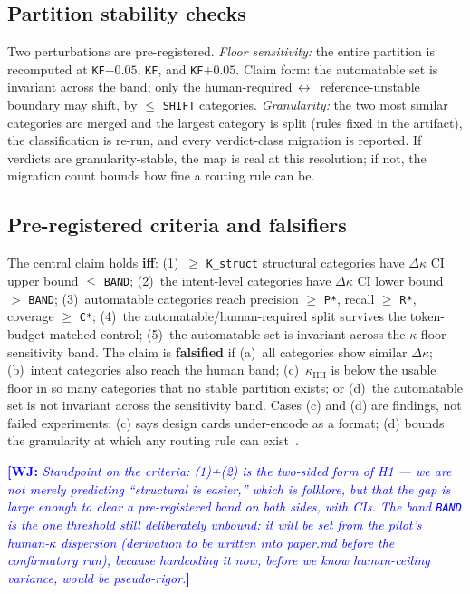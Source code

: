 \documentclass[conference]{IEEEtran}
\newcommand{\wj}[1]{\textcolor{blue}{\textbf{[WJ:} \textit{#1}\textbf{]}}}
\newcommand{\ph}[1]{\colorbox{yellow!35}{\texttt{\footnotesize #1}}}
\newcommand{\kh}{\kappa_{\mathrm{HH}}}
\newcommand{\dk}{\Delta\kappa}
\begin{document}
\subsection{Partition stability checks}\label{sec:design:stability}
Two perturbations are pre-registered.
\emph{Floor sensitivity:} the entire partition is recomputed at
\ph{KF}$-0.05$, \ph{KF}, and \ph{KF}$+0.05$. Claim form: the automatable set is
invariant across the band; only the human-required$\,\leftrightarrow\,$%
reference-unstable boundary may shift, by $\leq$ \ph{SHIFT} categories.
\emph{Granularity:} the two most similar categories are merged and the largest
category is split (rules fixed in the artifact), the classification is re-run,
and every verdict-class migration is reported. If verdicts are
granularity-stable, the map is real at this resolution; if not, the migration
count bounds how fine a routing rule can be.

\subsection{Pre-registered criteria and falsifiers}\label{sec:design:prereg}
The central claim holds \textbf{iff}:
(1)~$\geq$ \ph{K\_struct} structural categories have $\dk$ CI upper bound
$\leq$ \ph{BAND};
(2)~the intent-level categories have $\dk$ CI lower bound $>$ \ph{BAND};
(3)~automatable categories reach precision $\geq$ \ph{P*}, recall $\geq$
\ph{R*}, coverage $\geq$ \ph{C*};
(4)~the automatable/human-required split survives the token-budget-matched
control;
(5)~the automatable set is invariant across the $\kappa$-floor sensitivity
band.
The claim is \textbf{falsified} if
(a)~all categories show similar $\dk$;
(b)~intent categories also reach the human band;
(c)~$\kh$ is below the usable floor in so many categories that no stable
partition exists; or
(d)~the automatable set is not invariant across the sensitivity band.
Cases (c) and (d) are findings, not failed experiments: (c) says design cards
under-encode as a format; (d) bounds the granularity at which any routing rule
can exist~\cite{nosek2018preregistration}.

\wj{Standpoint on the criteria: (1)+(2) is the two-sided form of H1 --- we are
not merely predicting ``structural is easier,'' which is folklore, but that the
gap is large enough to clear a pre-registered band on both sides, with CIs. The
band \ph{BAND} is the one threshold still deliberately unbound: it will be set
from the pilot's human-$\kappa$ dispersion (derivation to be written into
paper.md before the confirmatory run), because hardcoding it now, before we
know human-ceiling variance, would be pseudo-rigor.}
\end{document}
